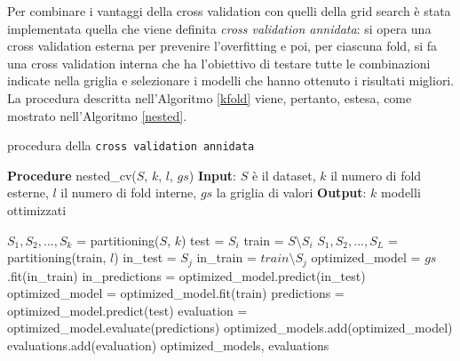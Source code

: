 \documentclass[12pt]{report}
\theoremstyle{definition}
\begin{document}
Per combinare i vantaggi della cross validation con quelli della grid search è stata implementata quella che viene definita \textit{cross validation annidata}: si opera una cross validation esterna per prevenire l'overfitting e poi, per ciascuna fold, si fa una cross validation interna che ha l'obiettivo di testare tutte le combinazioni indicate nella griglia e selezionare i modelli che hanno ottenuto i risultati migliori.
\\
La procedura descritta nell'Algoritmo \ref{kfold} viene, pertanto, estesa, come mostrato nell'Algoritmo \ref{nested}.
\begin{algorithm}
\caption{procedura della \texttt{cross validation annidata}}
\label{nested}
\hspace*{\algorithmicindent} \textbf{Procedure} nested\_cv($S$, $k$, $l$, $gs$)
\newline
\hspace*{\algorithmicindent} \textbf{Input}: $S$ è il dataset, $k$ il numero di fold esterne, $l$ il numero di fold interne, $gs$ la griglia di valori
\newline
\hspace*{\algorithmicindent} \textbf{Output}: $k$ modelli ottimizzati
\begin{algorithmic}[1]
\STATE $S_1, S_2, ..., S_k$ = partitioning($S$, $k$)
\STATE test = $S_i$
\STATE train = $S \setminus S_i$
\STATE $S_1, S_2, ..., S_L$ = partitioning(train, $l$)
\STATE in\_test = $S_j$
\STATE in\_train = $train \setminus S_j$
\STATE optimized\_model = $gs$.fit(in\_train)
\STATE in\_predictions = optimized\_model.predict(in\_test)
\ENDFOR
\STATE optimized\_model = optimized\_model.fit(train)
\STATE predictions = optimized\_model.predict(test)
\STATE evaluation = optimized\_model.evaluate(predictions) 
\STATE optimized\_models.add(optimized\_model)
\STATE evaluations.add(evaluation)
\ENDFOR
\RETURN optimized\_models, evaluations
\end{algorithmic}
\end{algorithm}
\end{document}
